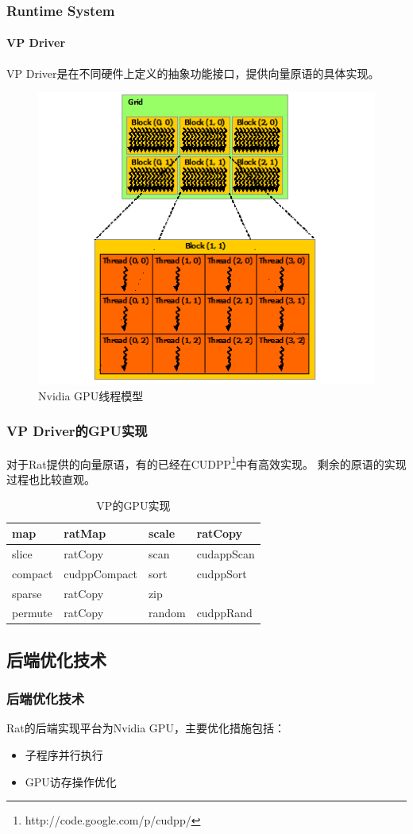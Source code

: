 \documentclass{beamer}
\begin{document}
\begin{frame}
  \frametitle{Runtime System}
  \framesubtitle{VP Driver}
  VP Driver是在不同硬件上定义的抽象功能接口，提供向量原语的具体实现。
  \begin{figure}
    \caption{Nvidia GPU线程模型}
    \includegraphics[scale=0.4]{images/grid-of-thread-blocks.png}
  \end{figure}
\end{frame}

\begin{frame}
  \frametitle{VP Driver的GPU实现}
  对于Rat提供的向量原语，有的已经在CUDPP\footnote{http://code.google.com/p/cudpp/}中有高效实现。
  剩余的原语的实现过程也比较直观。
  \begin{table}
    \caption{VP的GPU实现}
    \begin{tabular}{|l|l||l|l|}
      \hline
      map & ratMap & scale & ratCopy\\
      \hline
      slice & ratCopy & scan & cudappScan\\
      \hline
      compact & cudppCompact & sort & cudppSort\\
      \hline
      sparse & ratCopy & zip & \\
      \hline
      permute & ratCopy & random & cudppRand\\
      \hline
    \end{tabular}
  \end{table}
\end{frame}

\subsection{后端优化技术}
\begin{frame}
  \frametitle{后端优化技术}
  Rat的后端实现平台为Nvidia GPU，主要优化措施包括：
  \begin{itemize}
    \item 子程序并行执行
    \item GPU访存操作优化
  \end{itemize}
\end{frame}
\end{document}
